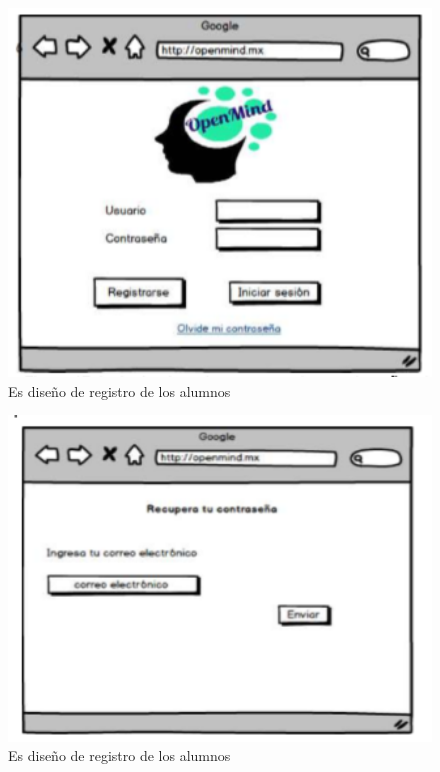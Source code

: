 \documentclass[letterpaper,oneside,openany,11pt]{book}
\begin{document}
 \begin{figure}[H]
	\centering
	\includegraphics[width=1.0\textwidth]{./Imagenes/37}
	\caption{Es diseño de registro de los alumnos}
\end{figure}

 \begin{figure}[H]
	\centering
	\includegraphics[width=1.0\textwidth]{./Imagenes/38}
	\caption{Es diseño de registro de los alumnos}
\end{figure}
\end{document}
